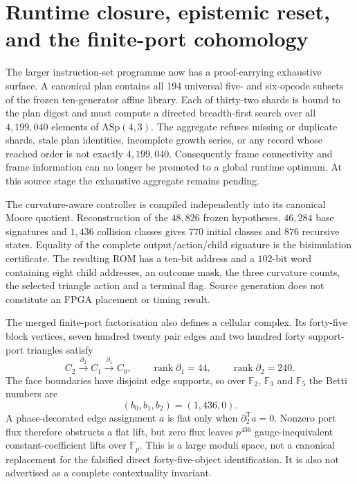 \section{Runtime closure, epistemic reset, and the finite-port cohomology}
\label{sec:pass3214-runtime-reset-sheaf}

The larger instruction-set programme now has a proof-carrying exhaustive surface.  A canonical
plan contains all $194$ universal five- and six-opcode subsets of the frozen ten-generator
affine library.  Each of thirty-two shards is bound to the plan digest and must compute a directed
breadth-first search over all $4{,}199{,}040$ elements of $\mathrm{ASp}(4,3)$.  The aggregate
refuses missing or duplicate shards, stale plan identities, incomplete growth series, or any
record whose reached order is not exactly $4{,}199{,}040$.  Consequently frame connectivity and
frame information can no longer be promoted to a global runtime optimum.  At this source stage
the exhaustive aggregate remains pending.

The curvature-aware controller is compiled independently into its canonical Moore quotient.
Reconstruction of the $48{,}826$ frozen hypotheses, $46{,}284$ base signatures and $1{,}436$
collision classes gives $770$ initial classes and $876$ recursive states.  Equality of the
complete output/action/child signature is the bisimulation certificate.  The resulting ROM has a
ten-bit address and a $102$-bit word containing eight child addresses, an outcome mask, the three
curvature counts, the selected triangle action and a terminal flag.  Source generation does not
constitute an FPGA placement or timing result.

The merged finite-port factorisation also defines a cellular complex.  Its forty-five block
vertices, seven hundred twenty pair edges and two hundred forty support-port triangles satisfy
\[
 C_2\xrightarrow{\partial_2}C_1\xrightarrow{\partial_1}C_0,
 \qquad
 \operatorname{rank}\partial_1=44,
 \qquad
 \operatorname{rank}\partial_2=240.
\]
The face boundaries have disjoint edge supports, so over $\mathbb F_2$, $\mathbb F_3$ and
$\mathbb F_5$ the Betti numbers are
\[
 (b_0,b_1,b_2)=(1,436,0).
\]
A phase-decorated edge assignment $a$ is flat only when
$\partial_2^{\mathsf T}a=0$.  Nonzero port flux therefore obstructs a flat lift, but zero flux
leaves $p^{436}$ gauge-inequivalent constant-coefficient lifts over $\mathbb F_p$.  This is a
large moduli space, not a canonical replacement for the falsified direct forty-five-object
identification.  It is also not advertised as a complete contextuality invariant.

